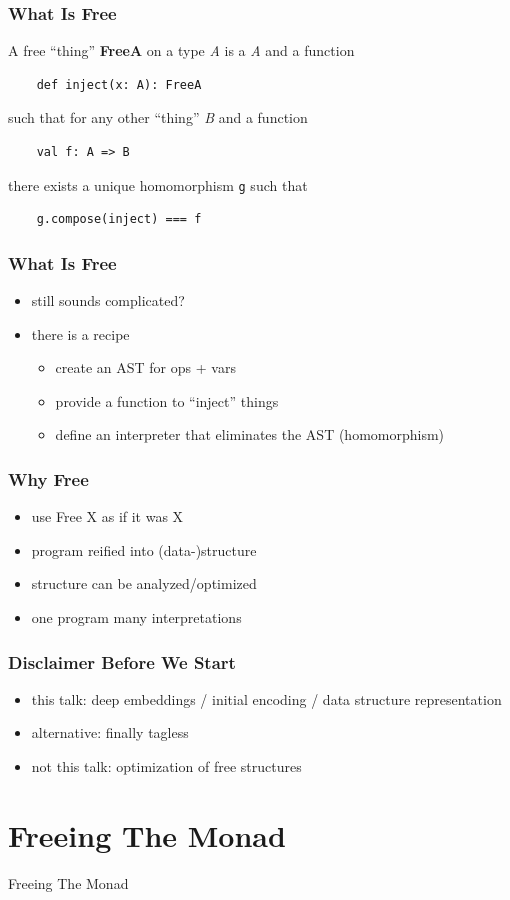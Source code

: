 \documentclass{beamer}
\newcommand{\recipe}{%
  \begin{itemize}
  \item create an AST for ops + vars
  \item provide a function to ``inject'' things
  \item define an interpreter that eliminates the AST (homomorphism)
  \end{itemize}
}
\begin{document}
\begin{frame}[fragile]
  \frametitle{What Is Free} A free ``thing'' \textbf{FreeA} on a type
  \textit{A} is a \textit{A} and a function
  \begin{verbatim}
    def inject(x: A): FreeA
  \end{verbatim}
  such that for any other ``thing'' \textit{B} and a function
  \begin{verbatim}
    val f: A => B
  \end{verbatim}
  there exists a unique homomorphism \texttt{g} such that
  \begin{verbatim}
    g.compose(inject) === f
  \end{verbatim}
\end{frame}

\begin{frame}[fragile]
  \frametitle{What Is Free}
  \begin{itemize}
  \item still sounds complicated?
  \item there is a recipe
    \recipe{}
  \end{itemize}
\end{frame}

\begin{frame}
  \frametitle{Why Free}
  \begin{itemize}
  \item use Free X as if it was X
  \item program reified into (data-)structure
  \item structure can be analyzed/optimized
  \item one program \textemdash{} many interpretations
  \end{itemize}
\end{frame}

\begin{frame}
  \frametitle{Disclaimer Before We Start}
  \begin{itemize}
  \item this talk: deep embeddings / initial encoding / data structure representation
  \item alternative: finally tagless
  \item not this talk: optimization of free structures
  \end{itemize}
\end{frame}

\section{Freeing The Monad}\label{sec:free-monad}
\begin{frame}
  \begin{center}
    \Huge
    Freeing The Monad
  \end{center}
\end{frame}
\end{document}
